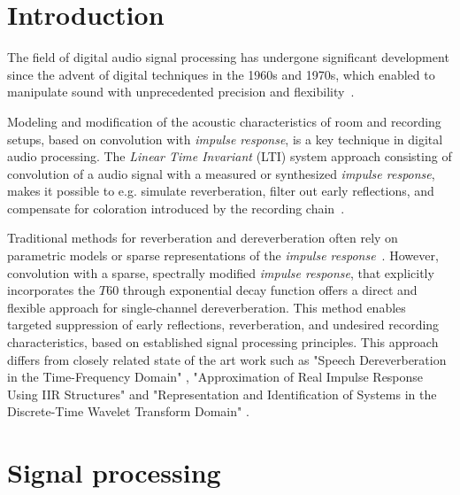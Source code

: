 \documentclass{article}
\begin{document}


\section{Introduction}
The field of digital audio signal processing has undergone significant development since the advent of digital techniques in the 1960s and 1970s, which enabled to manipulate sound with unprecedented precision and flexibility~\cite{oppenheim1989frequency,smith2011spectral}. %

Modeling and modification of the acoustic characteristics of room and recording setups, based on convolution with \textit{impulse response}, is a key technique in digital audio processing. The \textit{Linear Time Invariant} (LTI) system approach consisting of convolution of a audio signal with a measured or synthesized \textit{impulse response}, makes it possible to e.g. simulate reverberation, filter out early reflections, and compensate for coloration introduced by the recording chain~\cite{smith2011spectral,moorer1979reverberation}.

Traditional methods for reverberation and dereverberation often rely on parametric models or sparse representations of the \textit{impulse response}~\cite{moorer1979reverberation,HabetsThesis2007}. However, convolution with a sparse, spectrally modified \textit{impulse response}, that explicitly incorporates the $T60$ through exponential decay function offers a direct and flexible approach for single-channel dereverberation. This method enables targeted suppression of early reflections, reverberation, and undesired recording characteristics, based on established signal processing principles. This approach differs from closely related state of the art work such as "Speech Dereverberation in the Time-Frequency Domain" \cite{oyzerman2012}, "Approximation of Real Impulse Response Using IIR Structures" \cite{primavera2011} and "Representation and Identification of Systems in the Discrete-Time Wavelet Transform Domain" \cite{asm2007}.%

\newpage
\section{Signal processing}
\end{document}
